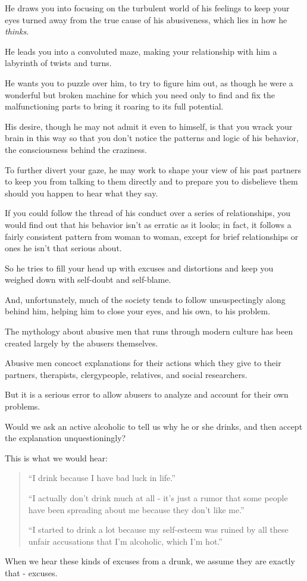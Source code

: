 \documentclass[oneside]{article}
\numberwithin{equation}{section}
\begin{document}
He draws you into focusing on the turbulent world of his feelings to keep your eyes turned away from the true cause of his abusiveness, which lies in how he \textit{thinks}.

He leads you into a convoluted maze, making your relationship with him a labyrinth of twists and turns.

He wants you to puzzle over him, to try to figure him out, as though he were a wonderful but broken machine for which you need only to find and fix the malfunctioning parts to bring it roaring to its full potential.

His desire, though he may not admit it even to himself, is that you wrack your brain in this way so that you don't notice the patterns and logic of his behavior, the consciousness behind the craziness.

%
To further divert your gaze, he may work to shape your view of his past partners to keep you from talking to them directly and to prepare you to disbelieve them should you happen to hear what they say.

If you could follow the thread of his conduct over a series of relationships, you would find out that his behavior isn't as erratic as it looks; in fact, it follows a fairly consistent pattern from woman to woman, except for brief relationships or ones he isn't that serious about.

%

So he tries to fill your head up with excuses and distortions and keep you weighed down with self-doubt and self-blame.

And, unfortunately, much of the society tends to follow unsuspectingly along behind him, helping him to close your eyes, and his own, to his problem.

%
The mythology about abusive men that runs through modern culture has been created largely by the abusers themselves.

Abusive men concoct explanations for their actions which they give to their partners, therapists, clergypeople, relatives, and social researchers.

But it is a serious error to allow abusers to analyze and account for their own problems.

Would we ask an active alcoholic to tell us why he or she drinks, and then accept the explanation unquestioningly?

This is what we would hear:
\begin{quotation}
    ``I drink because I have bad luck in life.''
    
    ``I actually don't drink much at all - it's just a rumor that some people have been spreading about me because they don't like me.''
    
    ``I started to drink a lot because my self-esteem was ruined by all these unfair accusations that I'm alcoholic, which I'm hot.''
\end{quotation}
When we hear these kinds of excuses from a drunk, we assume they are exactly that - excuses.
\end{document}
